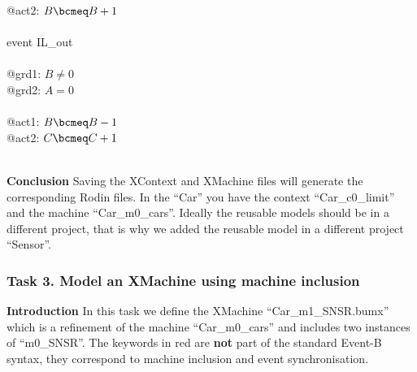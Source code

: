 \begin{description}
\begin{center}
\begin{Bcode}
			\Btab \Btab @act2: \(B \bcmeq B + 1\)\\
			\Btab \Bend\\
			\Btab event IL_out\\
			\Btab \Bwhere\\
			\Btab \Btab @grd1: \(B \neq 0\)\\
			\Btab \Btab @grd2: \(A = 0\)\\
			\Btab \Bthen\\
			\Btab \Btab @act1: \(B \bcmeq B - 1\)\\
			\Btab \Btab @act2: \(C \bcmeq C + 1\)\\
			\Btab \Bend\\
			\Bend
			\endif
		\end{Bcode}
	\end{center}
	
\end{description}
\textbf{Conclusion} Saving the XContext and XMachine files will generate the corresponding Rodin files. In the ``Car'' you have the context ``Car\_c0\_limit'' and the machine ``Car\_m0\_cars''. Ideally the reusable models should be in a different project, that is why we added the reusable model in a different project ``Sensor''.

\subsubsection{Task 3. Model an XMachine using machine inclusion}
\textbf{Introduction} In this task we define the XMachine ``Car\_m1\_SNSR.bumx'' which is a refinement of the machine ``Car\_m0\_cars'' and includes two instances of ``m0\_SNSR''. The keywords in red  are \textbf{not} part of the standard Event-B syntax, they correspond to machine inclusion and event synchronisation. 

